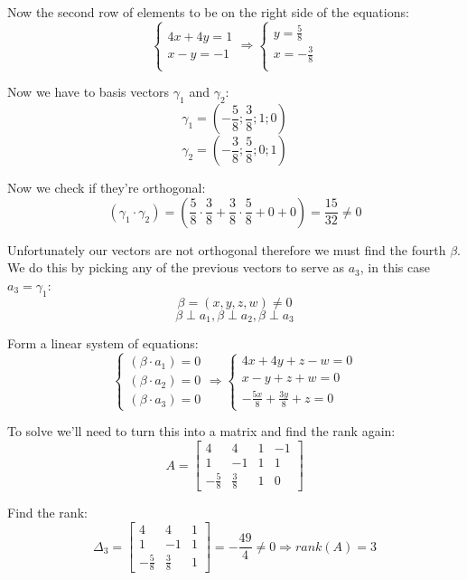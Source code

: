 \documentclass[11pt]{article}
\begin{document}
Now the second row of elements to be on the right side of the equations:
\[
\left\{
\begin{aligned}
4x+4y = 1 \\ 
x-y = -1
\end{aligned}
\Rightarrow
\left\{
\begin{aligned}
y = \frac{5}{8} \\
x = -\frac{3}{8} \\
\end{aligned}
\]

Now we have to basis vectors $\gamma_1$ and $\gamma_2$:
\[
\gamma_1 = \left( -\frac{5}{8}; \frac{3}{8}; 1; 0 \right)
\]
\[
\gamma_2 = \left( -\frac{3}{8}; \frac{5}{8}; 0; 1 \right)
\]

Now we check if they're orthogonal: 
\[
(\gamma_1 \cdot \gamma_2) = \left( \frac{5}{8} \cdot \frac{3}{8} + \frac{3}{8} \cdot \frac{5}{8} + 0 + 0 \right) = \frac{15}{32} \neq 0
\]

Unfortunately our vectors are not orthogonal therefore we must find the fourth $\beta$. \\
We do this by picking any of the previous vectors to serve as $a_3$, in this case $a_3 = \gamma_1$:
\[
\beta = (x,y,z,w) \neq 0
\]
\[
\beta \perp a_1, \beta \perp a_2, \beta \perp a_3
\]

Form a linear system of equations:
\[
\left\{
\begin{aligned}
(\beta \cdot a_1) = 0 \\
(\beta \cdot a_2) = 0 \\
(\beta \cdot a_3) = 0
\end{aligned}
\Rightarrow
\left\{
\begin{aligned}
4x + 4y + z - w = 0 \\
x - y + z + w = 0 \\
-\frac{5x}{8}+ \frac{3y}{8}+z = 0
\end{aligned}
\]

To solve we'll need to turn this into a matrix and find the rank again:
\[
A =
\begin{bmatrix}
4 & 4 & 1 & -1 \\
1 & -1 & 1 & 1 \\
-\frac{5}{8} & \frac{3}{8} & 1 & 0
\end{bmatrix}
\]

Find the rank:
\[
\Delta_3 = 
\begin{bmatrix}
4 & 4 & 1 \\
1 & -1 & 1 \\
-\frac{5}{8} & \frac{3}{8} & 1
\end{bmatrix}
= -\frac{49}{4} \neq 0
\Rightarrow
rank(A) =  3
\]
\end{document}

